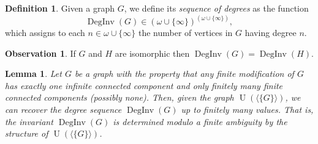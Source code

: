 \documentclass{amsart}
\newtheorem{lemma}[theorem]{Lemma}
\theoremstyle{plain}
\theoremstyle{definition}
\newtheorem{df}[theorem]{Definition}
\newtheorem{obs}[theorem]{Observation}
\theoremstyle{remark}
\numberwithin{equation}{section}
\DeclareMathOperator{\ds}{DegInv}
\DeclareMathOperator{\UN}{U}
\begin{document}
\begin{df} 
Given a graph $G$, we define its \emph{sequence of degrees} as the function
\[
\ds(G) \in \left( \omega \cup \{\infty\} \right)^{\left( \omega \cup \{\infty\} \right)},
\]
which assigns to each $n \in \omega \cup \{\infty\}$ the number of vertices in $G$ having degree $n$. 
\end{df}

\begin{obs}\label{O:stopnie wierzcholkow}
    If $G$ and $H$ are isomorphic then $\ds(G)=\ds(H)$.
\end{obs}

\begin{lemma}\label{L:OdzyskacDS}
Let $G$ be a graph with the property that any finite modification of $G$ has exactly one infinite connected component and only finitely many finite connected components (possibly none). Then, given the graph $\UN(\langle \{G\} \rangle)$, we can recover the degree sequence $\ds(G)$ up to finitely many values. That is, the invariant $\ds(G)$ is determined modulo a finite  ambiguity by the structure of $\UN(\langle \{G\} \rangle)$.
\end{lemma}
\end{document}
